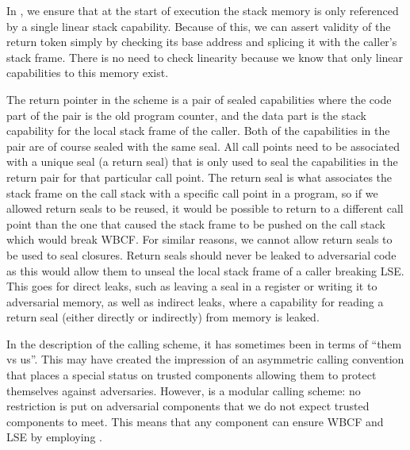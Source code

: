 \documentclass[acmsmall,review,anonymous]{acmart}\settopmatter{printfolios=true,printccs=false,printacmref=false}
\begin{document}
In \stktokens{}, we ensure that at the start of execution the stack memory is only referenced by a single linear stack capability.
Because of this, we can assert validity of the return token simply by checking its base address and splicing it with the caller's stack frame.
There is no need to check linearity because we know that only linear capabilities to this memory exist.

The return pointer in the \stktokens{} scheme is a pair of sealed capabilities where the code part of the pair is the old program counter, and the data part is the stack capability for the local stack frame of the caller.
Both of the capabilities in the pair are of course sealed with the same seal.
All call points need to be associated with a unique seal (a return seal) that is only used to seal the capabilities in the return pair for that particular call point.
The return seal is what associates the stack frame on the call stack with a specific call point in a program, so if we allowed return seals to be reused, it would be possible to return to a different call point than the one that caused the stack frame to be pushed on the call stack which would break WBCF.
For similar reasons, we cannot allow return seals to be used to seal closures.
Return seals should never be leaked to adversarial code as this would allow them to unseal the local stack frame of a caller breaking LSE.
This goes for direct leaks, such as leaving a seal in a register or writing it to adversarial memory, as well as indirect leaks, where a capability for reading a return seal (either directly or indirectly) from memory is leaked.

In the description of the \stktokens{} calling scheme, it has sometimes been in terms of ``them vs us''.
This may have created the impression of an asymmetric calling convention that places a special status on trusted components allowing them to protect themselves against adversaries.
However, \stktokens{} is a modular calling scheme: no restriction is put on adversarial components that we do not expect trusted components to meet.
This means that any component can ensure WBCF and LSE by employing \stktokens{}.
\end{document}
